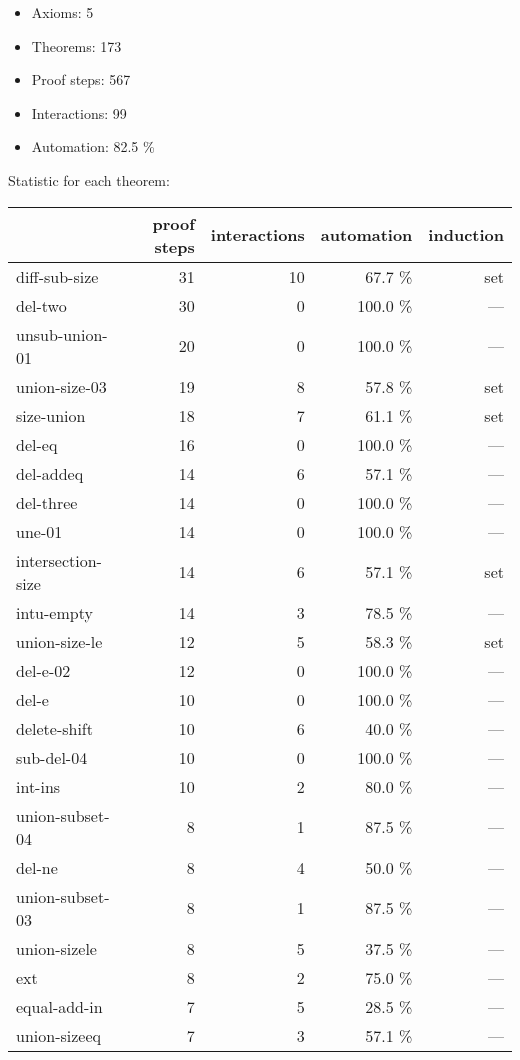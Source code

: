 \documentclass[a4paper]{article}
\begin{document}
\raggedright
              
\begin{itemize}
\item Axioms: 5
\item Theorems: 173
\item Proof steps: 567
\item Interactions: 99
\item Automation: 82.5 \%
\end{itemize}


Statistic for each theorem:

\begin{supertabular}{l|r|r|r|r}
	& proof steps & interactions & automation & induction\\ \hline
diff-sub-size & 31 & 10 & 67.7 \% & set\\
del-two & 30 & 0 & 100.0 \% & ---\\
unsub-union-01 & 20 & 0 & 100.0 \% & ---\\
union-size-03 & 19 & 8 & 57.8 \% & set\\
size-union & 18 & 7 & 61.1 \% & set\\
del-eq & 16 & 0 & 100.0 \% & ---\\
del-addeq & 14 & 6 & 57.1 \% & ---\\
del-three & 14 & 0 & 100.0 \% & ---\\
une-01 & 14 & 0 & 100.0 \% & ---\\
intersection-size & 14 & 6 & 57.1 \% & set\\
intu-empty & 14 & 3 & 78.5 \% & ---\\
union-size-le & 12 & 5 & 58.3 \% & set\\
del-e-02 & 12 & 0 & 100.0 \% & ---\\
del-e & 10 & 0 & 100.0 \% & ---\\
delete-shift & 10 & 6 & 40.0 \% & ---\\
sub-del-04 & 10 & 0 & 100.0 \% & ---\\
int-ins & 10 & 2 & 80.0 \% & ---\\
union-subset-04 & 8 & 1 & 87.5 \% & ---\\
del-ne & 8 & 4 & 50.0 \% & ---\\
union-subset-03 & 8 & 1 & 87.5 \% & ---\\
union-sizele & 8 & 5 & 37.5 \% & ---\\
ext & 8 & 2 & 75.0 \% & ---\\
equal-add-in & 7 & 5 & 28.5 \% & ---\\
union-sizeeq & 7 & 3 & 57.1 \% & ---\\

\end{supertabular}
\end{document}

